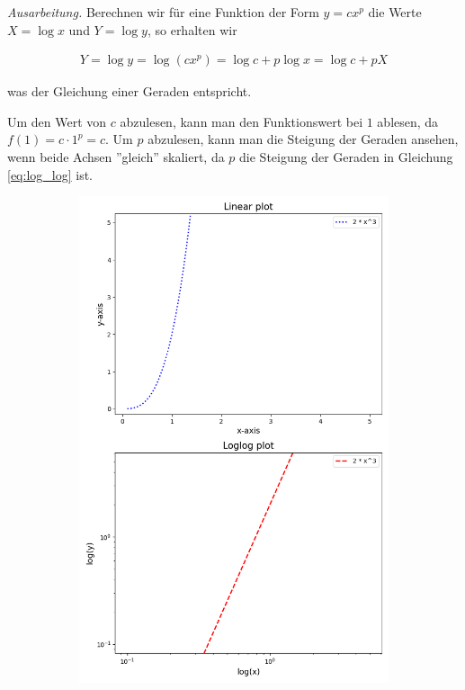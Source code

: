 \documentclass[titlepage]{article}
\newenvironment{ausarbeitung}{\vspace{3mm}\noindent\textit{Ausarbeitung.}}{}
\begin{document}
\begin{ausarbeitung}
	Berechnen wir für eine Funktion der Form $y=cx^p$ die Werte $X=\log x$ und $Y = \log y$, so erhalten wir
	
	\begin{align}
		Y = \log y = \log(c x^p) = \log c + p \log x = \log c + p X
	\end{align}

	was der Gleichung einer Geraden entspricht.

	Um den Wert von $c$ abzulesen, kann man den Funktionswert bei $1$ ablesen, da $f(1) = c \cdot 1^p = c$. Um $p$ abzulesen, kann man die Steigung der Geraden ansehen, wenn beide Achsen ''gleich'' skaliert, da $p$ die Steigung der Geraden in Gleichung \ref{eq:log_log} ist.
	
	\begin{figure}
		\centering
		\begin{subfigure}{0.48\textwidth}
			\includegraphics[width=\textwidth]{loglog_plot_a}

\end{subfigure}
\end{figure}
\end{ausarbeitung}
\end{document}
